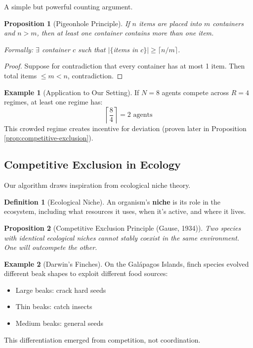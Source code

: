 \documentclass[11pt,a4paper]{article}
\theoremstyle{definition}
\newtheorem{definition}{Definition}[section]
\newtheorem{example}{Example}[section]
\theoremstyle{plain}
\newtheorem{proposition}{Proposition}[section]
\begin{document}
A simple but powerful counting argument.

\begin{proposition}[Pigeonhole Principle]
If $n$ items are placed into $m$ containers and $n > m$, then at least one container contains more than one item.

Formally: $\exists$ container $c$ such that $|\{$items in $c\}| \geq \lceil n/m \rceil$.
\end{proposition}

\begin{proof}
Suppose for contradiction that every container has at most 1 item. Then total items $\leq m < n$, contradiction.
\end{proof}

\begin{example}[Application to Our Setting]
If $N = 8$ agents compete across $R = 4$ regimes, at least one regime has:
\[
\left\lceil \frac{8}{4} \right\rceil = 2 \text{ agents}
\]
This crowded regime creates incentive for deviation (proven later in Proposition \ref{prop:competitive-exclusion}).
\end{example}

\subsection{Competitive Exclusion in Ecology}

Our algorithm draws inspiration from ecological niche theory.

\begin{definition}[Ecological Niche]
An organism's \textbf{niche} is its role in the ecosystem, including what resources it uses, when it's active, and where it lives.
\end{definition}

\begin{proposition}[Competitive Exclusion Principle (Gause, 1934)]
Two species with identical ecological niches cannot stably coexist in the same environment. One will outcompete the other.
\end{proposition}

\begin{example}[Darwin's Finches]
On the Gal\'{a}pagos Islands, finch species evolved different beak shapes to exploit different food sources:
\begin{itemize}
    \item Large beaks: crack hard seeds
    \item Thin beaks: catch insects
    \item Medium beaks: general seeds
\end{itemize}
This differentiation emerged from competition, not coordination.
\end{example}
\end{document}
